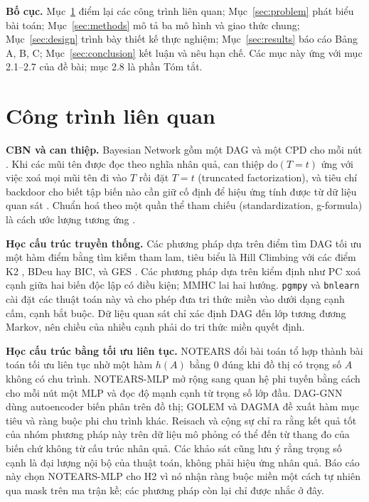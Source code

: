 \documentclass[pdflatex,sn-mathphys-num]{sn-jnl}%
\newcommand{\doop}{\mathrm{do}}                   %
\begin{document}
\textbf{Bố cục.} Mục~\ref{sec:related} điểm lại các công trình liên quan; Mục~\ref{sec:problem} phát biểu bài toán; Mục~\ref{sec:methods} mô tả ba mô hình và giao thức chung; Mục~\ref{sec:design} trình bày thiết kế thực nghiệm; Mục~\ref{sec:results} báo cáo Bảng A, B, C; Mục~\ref{sec:conclusion} kết luận và nêu hạn chế. Các mục này ứng với mục 2.1--2.7 của đề bài; mục 2.8 là phần Tóm tắt.

\section{Công trình liên quan}\label{sec:related}

\textbf{CBN và can thiệp.} Bayesian Network gồm một DAG và một CPD cho mỗi nút \cite{koller2009}. Khi các mũi tên được đọc theo nghĩa nhân quả, can thiệp $\doop(T{=}t)$ ứng với việc xoá mọi mũi tên đi vào $T$ rồi đặt $T=t$ (truncated factorization), và tiêu chí backdoor cho biết tập biến nào cần giữ cố định để hiệu ứng tính được từ dữ liệu quan sát \cite{pearl2009}. Chuẩn hoá theo một quần thể tham chiếu (standardization, g-formula) là cách ước lượng tương ứng \cite{hernan2020}.

\textbf{Học cấu trúc truyền thống.} Các phương pháp dựa trên điểm tìm DAG tối ưu một hàm điểm bằng tìm kiếm tham lam, tiêu biểu là Hill Climbing với các điểm K2 \cite{cooper1992}, BDeu \cite{heckerman1995} hay BIC, và GES \cite{chickering2002}. Các phương pháp dựa trên kiểm định như PC \cite{spirtes2000} xoá cạnh giữa hai biến độc lập có điều kiện; MMHC \cite{tsamardinos2006} lai hai hướng. \texttt{pgmpy} \cite{pgmpy2024} và \texttt{bnlearn} \cite{scutari2010} cài đặt các thuật toán này và cho phép đưa tri thức miền vào dưới dạng cạnh cấm, cạnh bắt buộc. Dữ liệu quan sát chỉ xác định DAG đến lớp tương đương Markov, nên chiều của nhiều cạnh phải do tri thức miền quyết định.

\textbf{Học cấu trúc bằng tối ưu liên tục.} NOTEARS \cite{zheng2018} đổi bài toán tổ hợp thành bài toán tối ưu liên tục nhờ một hàm $h(A)$ bằng 0 đúng khi đồ thị có trọng số $A$ không có chu trình. NOTEARS-MLP \cite{zheng2020} mở rộng sang quan hệ phi tuyến bằng cách cho mỗi nút một MLP và đọc độ mạnh cạnh từ trọng số lớp đầu. DAG-GNN \cite{yu2019} dùng autoencoder biến phân trên đồ thị; GOLEM \cite{ng2020} và DAGMA \cite{bello2022} đề xuất hàm mục tiêu và ràng buộc phi chu trình khác. Reisach và cộng sự \cite{reisach2021} chỉ ra rằng kết quả tốt của nhóm phương pháp này trên dữ liệu mô phỏng có thể đến từ thang đo của biến chứ không từ cấu trúc nhân quả. Các khảo sát \cite{vowels2022} cũng lưu ý rằng trọng số cạnh là đại lượng nội bộ của thuật toán, không phải hiệu ứng nhân quả. Báo cáo này chọn NOTEARS-MLP cho H2 vì nó nhận ràng buộc miền một cách tự nhiên qua mask trên ma trận kề; các phương pháp còn lại chỉ được nhắc ở đây.
\end{document}
